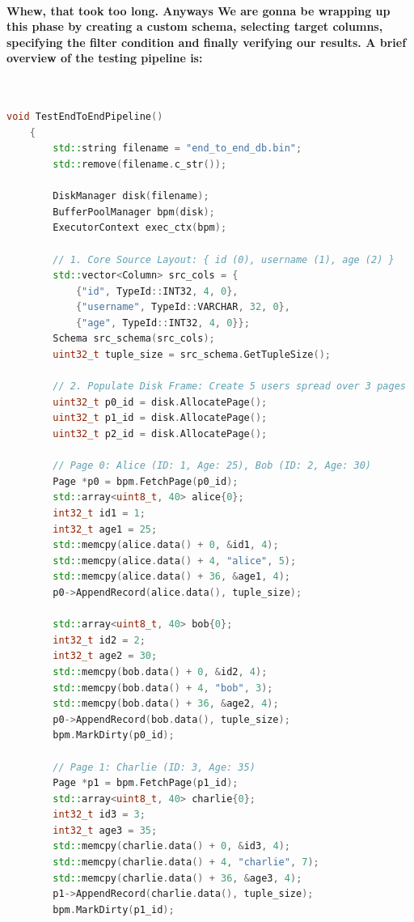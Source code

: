 \documentclass{article}
\begin{document}
\paragraph{
    Whew, that took too long. Anyways We are gonna be wrapping up this phase by creating a custom schema, selecting target columns,
    specifying the filter condition and finally verifying our results. A brief overview of the testing pipeline is: 
} \mbox{} \\
\begin{lstlisting}[language=C++]
    void TestEndToEndPipeline()
    {
        std::string filename = "end_to_end_db.bin";
        std::remove(filename.c_str());

        DiskManager disk(filename);
        BufferPoolManager bpm(disk);
        ExecutorContext exec_ctx(bpm);

        // 1. Core Source Layout: { id (0), username (1), age (2) }
        std::vector<Column> src_cols = {
            {"id", TypeId::INT32, 4, 0},
            {"username", TypeId::VARCHAR, 32, 0},
            {"age", TypeId::INT32, 4, 0}};
        Schema src_schema(src_cols);
        uint32_t tuple_size = src_schema.GetTupleSize();

        // 2. Populate Disk Frame: Create 5 users spread over 3 pages
        uint32_t p0_id = disk.AllocatePage();
        uint32_t p1_id = disk.AllocatePage();
        uint32_t p2_id = disk.AllocatePage();

        // Page 0: Alice (ID: 1, Age: 25), Bob (ID: 2, Age: 30)
        Page *p0 = bpm.FetchPage(p0_id);
        std::array<uint8_t, 40> alice{0};
        int32_t id1 = 1;
        int32_t age1 = 25;
        std::memcpy(alice.data() + 0, &id1, 4);
        std::memcpy(alice.data() + 4, "alice", 5);
        std::memcpy(alice.data() + 36, &age1, 4);
        p0->AppendRecord(alice.data(), tuple_size);

        std::array<uint8_t, 40> bob{0};
        int32_t id2 = 2;
        int32_t age2 = 30;
        std::memcpy(bob.data() + 0, &id2, 4);
        std::memcpy(bob.data() + 4, "bob", 3);
        std::memcpy(bob.data() + 36, &age2, 4);
        p0->AppendRecord(bob.data(), tuple_size);
        bpm.MarkDirty(p0_id);

        // Page 1: Charlie (ID: 3, Age: 35)
        Page *p1 = bpm.FetchPage(p1_id);
        std::array<uint8_t, 40> charlie{0};
        int32_t id3 = 3;
        int32_t age3 = 35;
        std::memcpy(charlie.data() + 0, &id3, 4);
        std::memcpy(charlie.data() + 4, "charlie", 7);
        std::memcpy(charlie.data() + 36, &age3, 4);
        p1->AppendRecord(charlie.data(), tuple_size);
        bpm.MarkDirty(p1_id);


\end{lstlisting}
\end{document}
